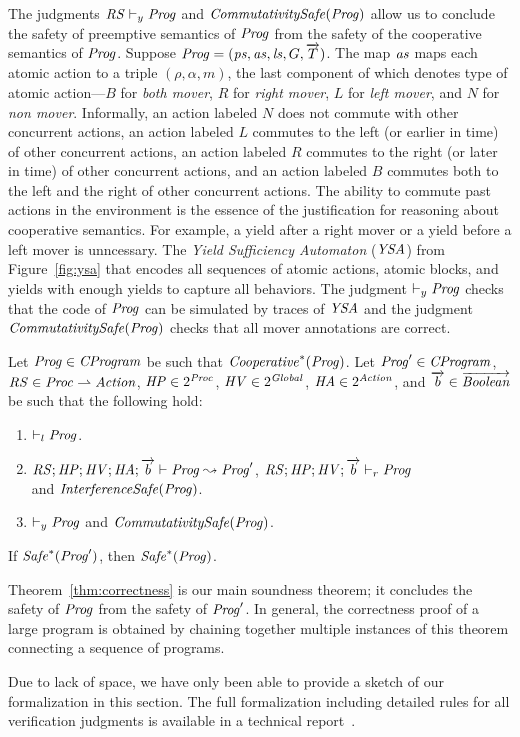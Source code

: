 The judgments $\mathit{RS} \vdash_y \mathit{Prog}$ and $\mathit{CommutativitySafe}(\mathit{Prog})$
allow us to conclude the safety of preemptive semantics of $\mathit{Prog}$
from the safety of the cooperative semantics of $\mathit{Prog}$.
Suppose $\mathit{Prog} = (\mathit{ps}, \mathit{as}, \mathit{ls}, G, \overrightarrow{T})$.
The map $\mathit{as}$ maps each atomic action to a triple $(\rho, \alpha, m)$, the last component of which 
denotes type of atomic action---$B$ for {\em both mover}, $R$ for {\em right mover}, $L$ for {\em left mover},
and $N$ for {\em non mover}.
Informally, an action labeled $N$ does not commute with other concurrent actions,
an action labeled $L$ commutes to the left (or earlier in time) of other concurrent actions,
an action labeled $R$ commutes to the right (or later in time) of other concurrent actions,
and an action labeled $B$ commutes both to the left and the right of other concurrent actions.
The ability to commute past actions in the environment is the essence of the justification 
for reasoning about cooperative semantics.
For example, a yield after a right mover or a yield before a left mover is unncessary.
The {\em Yield Sufficiency Automaton\/} ($\mathit{YSA}$) from Figure~\ref{fig:ysa} that encodes 
all sequences of atomic actions, atomic blocks, and yields with enough yields to capture all behaviors.
The judgment $\vdash_y \mathit{Prog}$ checks that the code of $\mathit{Prog}$ can be simulated by traces of $\mathit{YSA}$
and the judgment $\mathit{CommutativitySafe}(\mathit{Prog})$ checks that all mover annotations are correct.

\begin{theorem}
\label{thm:correctness}
Let $\mathit{Prog} \in \mathit{CProgram}$ be such that $\mathit{Cooperative}^*(\mathit{Prog})$.
Let $\mathit{Prog}' \in \mathit{CProgram}$, $\mathit{RS} \in \mathit{Proc} \rightharpoonup \mathit{Action}$, $\mathit{HP} \in 2^{\mathit{Proc}}$, 
$\mathit{HV} \in 2^{\mathit{Global}}$, $\mathit{HA} \in 2^{\mathit{Action}}$,
and $\overrightarrow{b} \in \overrightarrow{\mathit{Boolean}}$ be such that the following hold:
\begin{enumerate}
\item
$\vdash_l \mathit{Prog}$.
\item
$\mathit{RS};\mathit{HP};\mathit{HV};\mathit{HA};\overrightarrow{b} \vdash \mathit{Prog} \leadsto \mathit{Prog}'$,
$\mathit{RS};\mathit{HP};\mathit{HV};\overrightarrow{b} \vdash_r \mathit{Prog}$ \\ and $\mathit{InterferenceSafe}(\mathit{Prog})$.
\item
$\vdash_y \mathit{Prog}$ and $\mathit{CommutativitySafe}(\mathit{Prog})$.
\end{enumerate}
If $\mathit{Safe}^*(\mathit{Prog}')$, then $\mathit{Safe}^*(\mathit{Prog})$.
\end{theorem}

Theorem~\ref{thm:correctness} is our main soundness theorem;
it concludes the safety of $\mathit{Prog}$ from the safety of $\mathit{Prog}'$.
In general, the correctness proof of a large program is obtained by chaining together
multiple instances of this theorem connecting a sequence of programs.  

Due to lack of space, we have only been able to provide a sketch of our formalization in this section.
The full formalization including detailed rules for all verification judgments is available in a technical report~\cite{gc-techreport}.
